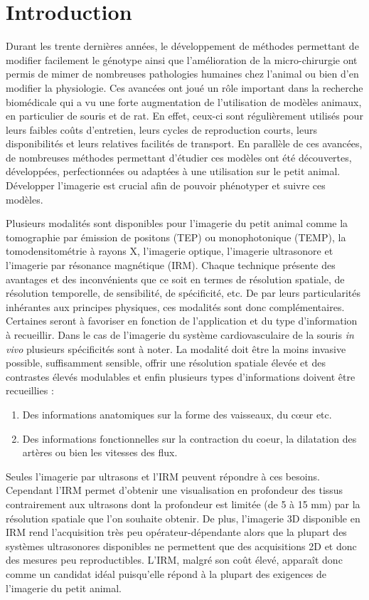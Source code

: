 \chapter{Introduction}
\setlength{\footskip}{50pt}
\label{Chap1}

Durant les trente dernières années, le développement de méthodes permettant de modifier facilement le génotype ainsi que l'amélioration de la micro-chirurgie ont permis de mimer de nombreuses pathologies humaines chez l'animal ou bien d'en modifier la physiologie. Ces avancées ont joué un rôle important dans la recherche biomédicale qui a vu une forte augmentation de l'utilisation de modèles animaux, en particulier de souris et de rat. En effet, ceux-ci sont régulièrement utilisés pour leurs faibles coûts d'entretien, leurs cycles de reproduction courts, leurs disponibilités et leurs relatives facilités de transport. En parallèle de ces avancées, de nombreuses méthodes permettant d'étudier ces modèles ont été découvertes, développées, perfectionnées ou adaptées à une utilisation sur le petit animal. Développer l'imagerie est crucial afin de pouvoir phénotyper et suivre ces modèles. 
\medbreak

Plusieurs modalités sont disponibles pour l'imagerie du petit animal comme la tomographie par émission de positons (TEP) ou monophotonique (TEMP), la tomodensitométrie à rayons X, l'imagerie optique, l'imagerie ultrasonore et l'imagerie par résonance magnétique (IRM). Chaque technique présente des avantages et des inconvénients que ce soit en termes de résolution spatiale, de résolution temporelle, de sensibilité, de spécificité, etc. De par leurs particularités inhérantes aux principes physiques, ces modalités sont donc complémentaires. Certaines seront à favoriser en fonction de l'application et du type d'information à recueillir.
\medbreak
%
Dans le cas de l'imagerie du système cardiovasculaire de la souris \textit{in vivo} plusieurs spécificités sont à noter. La modalité doit être la moins invasive possible, suffisamment sensible, offrir une résolution spatiale élevée et des contrastes élevés modulables et enfin plusieurs types d'informations doivent être recueillies :
\begin{enumerate}
 \item Des informations anatomiques sur la forme des vaisseaux, du cœur etc.
 \item Des informations fonctionnelles sur la contraction du coeur, la dilatation des artères ou bien les vitesses des flux.
\end{enumerate}
Seules l'imagerie par ultrasons et l'IRM peuvent répondre à ces besoins. Cependant l'IRM permet d'obtenir une visualisation en profondeur des tissus contrairement aux ultrasons dont la profondeur est limitée (de 5 à 15 mm) par la résolution spatiale que l'on souhaite obtenir. De plus, l'imagerie 3D disponible en IRM rend l'acquisition très peu opérateur-dépendante alors que la plupart des systèmes ultrasonores disponibles ne permettent que des acquisitions 2D et donc des mesures peu reproductibles. L'IRM, malgré son coût élevé, apparaît donc comme un candidat idéal puisqu'elle répond à la plupart des exigences de l'imagerie du petit animal.

